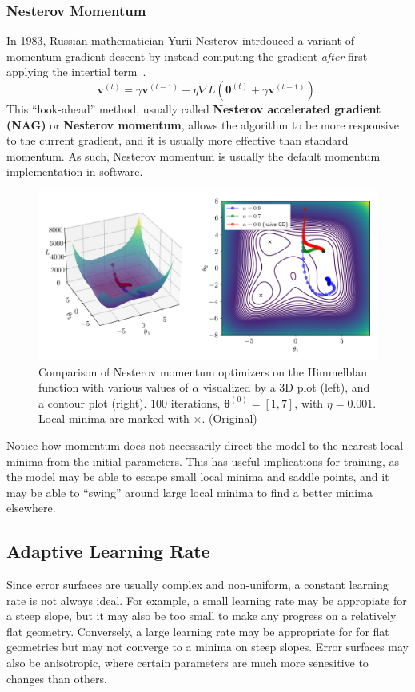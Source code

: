 \documentclass[12pt]{report}
\theoremstyle{definition}
\theoremstyle{remark}
\begin{document}
\subsubsection{Nesterov Momentum}
In 1983, Russian mathematician Yurii Nesterov intrdouced a variant of momentum gradient descent by instead computing the gradient \textit{after} first applying the intertial term~\cite{nesterov_method_1983}.
\begin{equation}
    \mathbf{v}^{(t)} = \gamma \mathbf{v}^{(t-1)} - \eta \nabla L(\boldsymbol{\theta}^{(t)} + \gamma \mathbf{v}^{(t-1)}).
\end{equation}
This ``look-ahead'' method, usually called \textbf{Nesterov accelerated gradient (NAG)} or \textbf{Nesterov momentum}, allows the algorithm to be more responsive to the current gradient, and it is usually more effective than standard momentum. As such, Nesterov momentum is usually the default momentum implementation in software.
\begin{figure}[h]
    \centering
    \includegraphics[width=\linewidth]{figs/nesterov_comparison.png}
    \caption{Comparison of Nesterov momentum optimizers on the Himmelblau function with various values of $\alpha$ visualized by a 3D plot (left), and a contour plot (right). $100$ iterations, $\boldsymbol{\theta}^{(0)} = [1,7]$, with $\eta = 0.001$. Local minima are marked with $\times$. (Original)}
    \label{fig:enter-label}
\end{figure}
Notice how momentum does not necessarily direct the model to the nearest local minima from the initial parameters. This has useful implications for training, as the model may be able to escape small local minima and saddle points, and it may be able to ``swing'' around large local minima to find a better minima elsewhere.

\subsection{Adaptive Learning Rate}
Since error surfaces are usually complex and non-uniform, a constant learning rate is not always ideal. For example, a small learning rate may be appropiate for a steep slope, but it may also be too small to make any progress on a relatively flat geometry. Conversely, a large learning rate may be appropriate for for flat geometries but may not converge to a minima on steep slopes. Error surfaces may also be anisotropic, where certain parameters are much more senesitive to changes than others.
\end{document}

